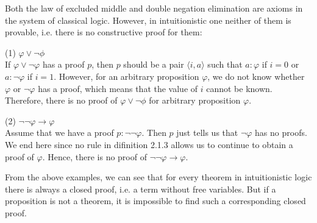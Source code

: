 Both the law of excluded middle and double negation elimination are axioms in the system of classical logic. However, in intuitionistic one neither of them is provable, i.e. there is no constructive proof for them:
\begin{myitemize}
\item[(1)] $ \varphi \lor \neg \phi $\\
If $ \varphi \lor \neg \varphi $ has a proof $ p $, then $ p $ should be a pair $ \langle i, a \rangle $ such that $ a: \varphi $ if $ i = 0 $ or $ a: \neg \varphi $ if $ i = 1 $. However, for an arbitrary proposition $ \varphi $, we do not know whether $ \varphi $ or $ \neg \varphi $ has a proof, which means that the value of $ i $ cannot be known. Therefore, there is no proof of $ \varphi \lor \neg \phi $ for arbitrary proposition $ \varphi $.
\item[(2)] $ \neg \neg \varphi \to \varphi $\\
Assume that we have a proof $ p: \neg \neg \varphi $. Then $ p $ just tells us that $ \neg \varphi $ has no proofs. We end here since no rule in difinition 2.1.3 allows us to continue to obtain a proof of $ \varphi $. Hence, there is no proof of $ \neg \neg \varphi \to \varphi $.
\end{myitemize}

From the above examples, we can see that for every theorem in intuitionistic logic there is always a closed proof, i.e. a term without free variables. But if a proposition is not a theorem, it is impossible to find such a corresponding closed proof.